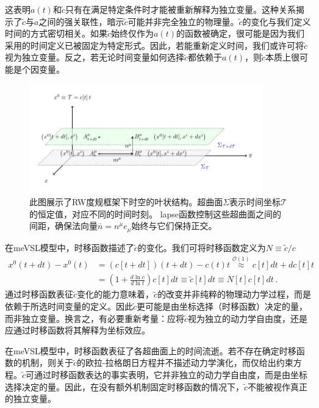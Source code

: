 \documentclass[jkps,preprint,fleqn]{revtex4}
\newcommand{\tc}{\tilde{c}}
\begin{document}
\begin{CJK*}{UTF8}{gbsn}
这表明$a(t)$和$\tc$只有在满足特定条件时才能被重新解释为独立变量。这种关系揭示了$\tc$与$a$之间的强关联性，暗示$\tc$可能并非完全独立的物理量。$\tc$的变化与我们定义时间的方式密切相关。如果$\tc$始终仅作为$a(t)$的函数被确定，很可能是因为我们采用的时间定义已被固定为特定形式。因此，若能重新定义时间，我们或许可将$\tc$视为独立变量。反之，若无论时间变量如何选择$\tc$都依赖于$a(t)$，则$\tc$本质上很可能是个因变量。

\begin{figure}
	\begin{center}
	\includegraphics[width=0.9\textwidth]{Fig2.pdf}
	\caption{此图展示了RW度规框架下时空的叶状结构。超曲面$\Sigma$表示时间坐标$\mathcal{T}$的恒定值，对应不同的时间时刻。 lapse函数控制这些超曲面之间的间距，确保法向量$\bar{n} = n^{\mu} e_{\mu}$始终与它们保持正交。}
	\label{Fig2}
	\end{center}
\end{figure}

在meVSL模型中，时移函数描述了$\tc$的变化。我们可将时移函数定义为$N \equiv \tc/c$
\begin{align}
x^{0}(t+dt) - x^{0}(t) &=  \left( c[t+dt] \right) \left( t+dt \right) - c(t) t \overset{\mathcal{O}(1)}{\approx} c[t] dt + dc[t] t \nonumber \\
	&= \left( 1 + \frac{d \ln c}{d \ln t} \right) c[t] dt \equiv \tilde{c}[t] dt \equiv N[t] c[t] dt \label{NmeVSL} \,.
\end{align}
通过时移函数表征$\tc$变化的能力意味着，$\tc$的改变并非纯粹的物理动力学过程，而是依赖于所选时间变量的定义。因此$\tc$更可能是由坐标选择（时移函数）决定的量，而非独立变量。换言之，有必要重新考量：应将$\tc$视为独立的动力学自由度，还是应通过时移函数将其解释为坐标效应。

在meVSL模型中，时移函数表征了各超曲面上的时间流逝。若不存在确定时移函数的机制，则关于$\tc$的欧拉-拉格朗日方程并不描述动力学演化，而仅给出约束方程。$\tc$可通过时移函数表达的事实表明，它并非独立的动力学自由度，而是由坐标选择决定的量。因此，在没有额外机制固定时移函数的情况下，$\tc$不能被视作真正的独立变量。


\end{CJK*}
\end{document}
